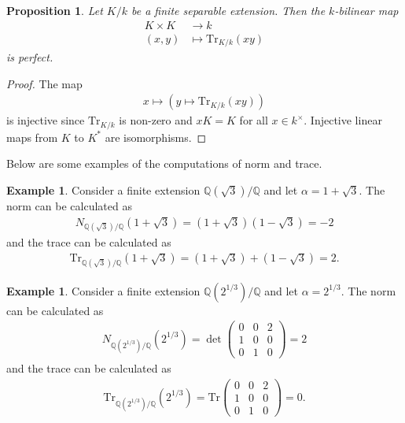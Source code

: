 \documentclass[12pt]{report}
\theoremstyle{plain}
\newtheorem{proposition}[theorem]{Proposition}
\theoremstyle{remark}
\theoremstyle{definition}
\newtheorem{example}[theorem]{Example}
\newcommand{\Q}{\mathbb{Q}}
\begin{document}
\begin{proposition}
    Let $K/k$ be a finite separable extension. Then the $k$-bilinear map
    \begin{align*}
        K\times K &\rightarrow k \\
        (x,y) &\mapsto \mathrm{Tr}_{K/k}(xy)
    \end{align*}
    is perfect.
\end{proposition}
\begin{proof}
    The map
    \begin{align*}
        x\mapsto \left( y\mapsto \mathrm{Tr}_{K/k}(xy) \right)
    \end{align*}
    is injective since $\mathrm{Tr}_{K/k}$ is non-zero and $xK=K$ for all $x\in k^\times$. Injective linear maps from $K$ to $K^*$ are isomorphisms.
\end{proof}

Below are some examples of the computations of norm and trace.

\begin{example}
    Consider a finite extension $\Q(\sqrt{3})/\Q$ and let $\alpha=1+\sqrt{3}$. The norm can be calculated as
    \begin{align*}
        N_{\Q(\sqrt{3})/\Q}(1+\sqrt{3}) = (1+\sqrt{3})(1-\sqrt{3})=-2
    \end{align*}
    and the trace can be calculated as
    \begin{align*}
        \mathrm{Tr}_{\Q(\sqrt{3})/\Q}(1+\sqrt{3})=(1+\sqrt{3})+(1-\sqrt{3})=2.
    \end{align*}
\end{example}

\begin{example}
    Consider a finite extension $\Q(2^{1/3})/\Q$ and let $\alpha=2^{1/3}$. The norm can be calculated as
    \begin{align*}
        N_{\Q(2^{1/3})/\Q}(2^{1/3}) = \det \begin{pmatrix}
            0 & 0 & 2 \\
            1 & 0 & 0 \\
            0 & 1 & 0
        \end{pmatrix} = 2
    \end{align*}
    and the trace can be calculated as
    \begin{align*}
        \mathrm{Tr}_{\Q(2^{1/3})/\Q}(2^{1/3}) = \mathrm{Tr} \begin{pmatrix}
            0 & 0 & 2 \\
            1 & 0 & 0 \\
            0 & 1 & 0
        \end{pmatrix} = 0.
    \end{align*}
\end{example}
\end{document}
